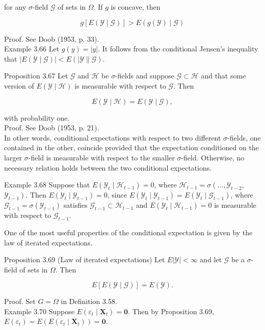 \documentclass[10pt]{article}
\begin{document}
for any $\sigma$-field $\mathcal{G}$ of sets in $\Omega$. If $g$ is concave, then

$$
g[E(\mathcal{Y} \mid \mathcal{G})]>E(g(\mathcal{Y}) \mid \mathcal{G})
$$

Proof. See Doob (1953, p. 33).\\
Example 3.66 Let $g(y)=|y|$. It follows from the conditional Jensen's inequality that $|E(\mathcal{Y} \mid \mathcal{G})|<E(\mid \mathcal{Y} \| \mathcal{G})$.

Proposition 3.67 Let $\mathcal{G}$ and $\mathcal{H}$ be $\sigma$-fields and suppose $\mathcal{G} \subset \mathcal{H}$ and that some version of $E(\mathcal{Y} \mid \mathcal{H})$ is measurable with respect to $\mathcal{G}$. Then

$$
E(\mathcal{Y} \mid \mathcal{H})=E(\mathcal{Y} \mid \mathcal{G}),
$$

with probability one.\\
Proof. See Doob (1953, p. 21).\\
In other words, conditional expectations with respect to two different $\sigma$-fields, one contained in the other, coincide provided that the expectation conditioned on the larger $\sigma$-field is measurable with respect to the smaller $\sigma$-field. Otherwise, no necessary relation holds between the two conditional expectations.

Example 3.68 Suppose that $E\left(\mathcal{Y}_{t} \mid \mathcal{H}_{t-1}\right)=0$, where $\mathcal{H}_{t-1}=\sigma\left(\ldots, \mathcal{Y}_{t-2}\right.$, $\left.\mathcal{Y}_{t-1}\right)$. Then $E\left(\mathcal{Y}_{t} \mid \mathcal{Y}_{t-1}\right)=0$, since $E\left(\mathcal{Y}_{t} \mid \mathcal{Y}_{t-1}\right)=E\left(\mathcal{Y}_{t} \mid \mathcal{G}_{t-1}\right)$, where $\mathcal{G}_{t-1}= \sigma\left(\mathcal{Y}_{t-1}\right)$ satisfies $\mathcal{G}_{t-1} \subset \mathcal{H}_{t-1}$ and $E\left(\mathcal{Y}_{t} \mid \mathcal{H}_{t-1}\right)=0$ is measurable with respect to $\mathcal{G}_{t-1}$.

One of the most useful properties of the conditional expectation is given by the law of iterated expectations.

Proposition 3.69 (Law of iterated expectations) Let $E|\mathcal{Y}|<\infty$ and let $\mathcal{G}$ be a $\sigma$-field of sets in $\Omega$. Then

$$
E[E(\mathcal{Y} \mid \mathcal{G})]=E(\mathcal{Y}) .
$$

Proof. Set $G=\Omega$ in Definition 3.58.\\
Example 3.70 Suppose $E\left(\varepsilon_{t} \mid \mathbf{X}_{t}\right)=\mathbf{0}$. Then by Proposition 3.69, $E\left(\varepsilon_{t}\right)= E\left(E\left(\varepsilon_{t} \mid \mathbf{X}_{t}\right)\right)=\mathbf{0}$.
\end{document}
